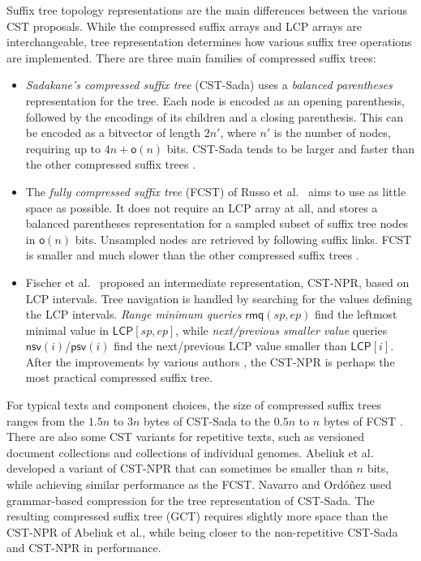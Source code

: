 \documentclass[a4paper,11pt]{llncs}
\newcommand{\CST}{\textsf{CST}}
\newcommand{\CSTsada}{\textsf{CST\nobreakdash-Sada}}
\newcommand{\GCT}{\textsf{GCT}}
\newcommand{\FCST}{\textsf{FCST}}
\newcommand{\CSTnpr}{\textsf{CST\nobreakdash-NPR}}
\newcommand{\LCP}{\textsf{LCP}}
\newcommand{\mLCP}{\ensuremath{\mathsf{LCP}}}
\newcommand{\mpsv}{\ensuremath{\mathsf{psv}}}
\newcommand{\mnsv}{\ensuremath{\mathsf{nsv}}}
\newcommand{\mrmq}{\ensuremath{\mathsf{rmq}}}
\newcommand{\oh}{\ensuremath{\mathsf{o}}}
\begin{document}
Suffix tree topology representations are the main differences between the various \CST{} proposals. While the compressed suffix arrays and \LCP{} arrays are interchangeable, tree representation determines how various suffix tree operations are implemented. There are three main families of compressed suffix trees:
\begin{itemize}
\item \emph{Sadakane's compressed suffix tree} (\CSTsada) \cite{Sadakane2007} uses a \emph{balanced parentheses} representation for the tree. Each node is encoded as an opening parenthesis, followed by the encodings of its children and a closing parenthesis. This can be encoded as a bitvector of length $2n'$, where $n'$ is the number of nodes, requiring up to $4n+\oh(n)$ bits. \CSTsada{} tends to be larger and faster than the other compressed suffix trees \cite{Gog2011a,Abeliuk2013}.
\item The \emph{fully compressed suffix tree} (\FCST) of Russo et al.~\cite{Russo2011,Navarro2014a} aims to use as little space as possible. It does not require an \LCP{} array at all, and stores a balanced parentheses representation for a sampled subset of suffix tree nodes in $\oh(n)$ bits. Unsampled nodes are retrieved by following suffix links. \FCST{} is smaller and much slower than the other compressed suffix trees \cite{Russo2011,Abeliuk2013}.
\item Fischer et al.~\cite{Fischer2009a} proposed an intermediate representation, \CSTnpr, based on \LCP{} intervals. Tree navigation is handled by searching for the values defining the \LCP{} intervals. \emph{Range minimum queries} $\mrmq(sp,ep)$ find the leftmost minimal value in $\mLCP[sp,ep]$, while \emph{next/previous smaller value} queries $\mnsv(i)$/$\mpsv(i)$ find the next/previous \LCP{} value smaller than $\mLCP[i]$. After the improvements by various authors \cite{Ohlebusch2009,Ohlebusch2010,Gog2011a,Abeliuk2013}, the \CSTnpr{} is perhaps the most practical compressed suffix tree.
\end{itemize}

For typical texts and component choices, the size of compressed suffix trees ranges from the $1.5n$ to $3n$ bytes of \CSTsada{} to the $0.5n$ to $n$ bytes of \FCST{} \cite{Gog2011a,Abeliuk2013}. There are also some \CST{} variants for repetitive texts, such as versioned document collections and collections of individual genomes. Abeliuk et al.~\cite{Abeliuk2013} developed a variant of \CSTnpr{} that can sometimes be smaller than $n$ bits, while achieving similar performance as the \FCST. Navarro and Ordóñez \cite{Navarro2014} used grammar-based compression for the tree representation of \CSTsada. The resulting compressed suffix tree (\GCT) requires slightly more space than the \CSTnpr{} of Abeliuk et al., while being closer to the non-repetitive \CSTsada{} and \CSTnpr{} in performance.
\end{document}
